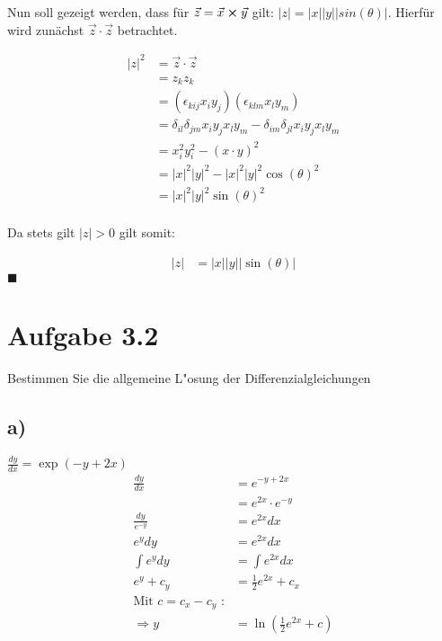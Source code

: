 \documentclass{theozettel}
\begin{document}
Nun soll gezeigt werden, dass für $\vec{z} = \vec{x} \cross \vec{y}$ gilt: $|z| = |x||y||sin(\theta)|$. Hierfür wird zunächst $\vec{z} \cdot \vec{z}$ betrachtet.

\begin{align*}
|z|^{2} &=  \vec{z} \cdot \vec{z} \\
&= z_k z_k \\
&= (\epsilon_{kij} x_i y_j) (\epsilon_{klm} x_l y_m) \\
&= \delta_{il} \delta_{jm} x_i y_j x_l y_m - \delta_{im} \delta_{jl} x_i y_j x_l y_m \\
&= x_i^{2} y_i^{2} - (x \cdot y)^{2} \\
&= |x|^{2} |y|^{2} -  |x|^{2} |y|^{2} \cos(\theta)^{2} \\
&= |x|^{2} |y|^{2} \sin(\theta)^{2} \\
\end{align*}

Da stets gilt $|z| > 0$ gilt somit:

\begin{align*}
|z| &= |x| |y| |\sin(\theta)| 
\end{align*} \hfill $\blacksquare$

\newpage
\section*{Aufgabe 3.2} Bestimmen Sie die allgemeine L"osung der Differenzialgleichungen\\
\subsection*{a)} $\frac{dy}{dx} = \exp\left(-y+2x\right)$\\
\begin{align*}
					\frac{dy}{dx} 	&= e^{-y+2x}\\
									&= e^{2x}\cdot e^{-y}\\
\frac{dy}{e^{-y}}	&= e^{2x} dx\\
e^y dy  &= e^{2x} dx\\
\int{e^y dy} &= \int{e^{2x} dx}\\
e^y +c_y &= \frac{1}{2} e^{2x} + c_x \\
\text{Mit }c=c_x-c_y \text{ :}\\
\Rightarrow y &= \ln{\left(\frac{1}{2}e^{2x} + c\right)} 
\end{align*}
\end{document}
